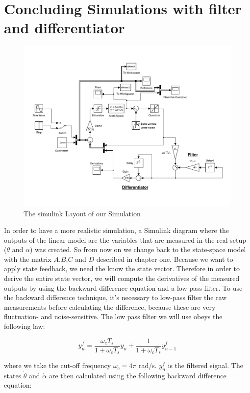 \documentclass[ twoside,openright,titlepage,numbers=noenddot,headinclude,%
                footinclude=true,cleardoublepage=empty,abstractoff, %
                BCOR=5mm,paper=a4,fontsize=11pt,%
                ngerman,american,%
                ]{scrreprt}
\begin{document}
\section{Concluding Simulations with filter and differentiator}
\begin{figure}
\includegraphics[scale=0.5]{images/simModel.pdf}
\caption{The simulink Layout of our Simulation}
\label{fig:notallStates}
\end{figure}

In order to have a more realistic simulation, a Simulink diagram where the outputs of the linear model are the variables that are measured in the real setup ($\theta$ and $\alpha$) was created. So from now on we change back to the state-space model with the matrix $A$,$B$,$C$ and $D$ described in chapter one. Because we want to apply state feedback, we need the know the state vector. Therefore in order to derive the entire state vector, we will compute the derivatives of the measured outputs by using the backward difference equation and a low pass filter. To use the backward difference technique, it's necessary to low-pass filter the raw measurements before calculating the difference, because these are very fluctuation- and noise-sensitive. The low pass filter we will use obeys the following law:

\begin{equation} \label{filter_equation}
y_n^f = \frac{\omega_c T_s}{1 + \omega_c T_s} y_n + \frac{1}{1 + \omega_c T_s} y_{n-1}^f
\end{equation}
 
where we take the cut-off frequency $\omega_c = 4 \pi$ rad/s. $y_n^f$ is the filtered signal. The states $\dot{\theta}$ and $\dot{\alpha}$ are then calculated using the following backward difference equation:
\end{document}
